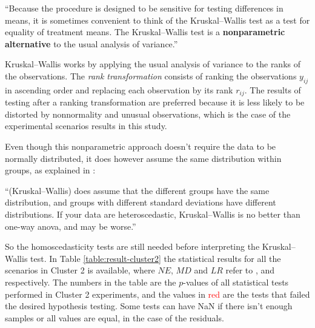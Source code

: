 \begin{displayquote}

``Because the procedure is designed to be sensitive for testing differences in means, it is sometimes convenient to think of the Kruskal–Wallis test as a test for equality of treatment means. The Kruskal–Wallis test is a \textbf{nonparametric alternative} to the usual analysis of variance.''

\end{displayquote}

Kruskal–Wallis works by applying the usual analysis of variance to the ranks of the observations. The \textit{rank transformation} consists of ranking the observations $y_{ij}$ in ascending order and replacing each observation by its rank $r_{ij}$. The results of testing after a ranking transformation are preferred because it is less likely to be distorted by nonnormality and unusual observations, which is the case of the experimental scenarios results in this study.

Even though this nonparametric approach doesn't require the data to be normally distributed, it does however assume the same distribution within groups, as explained in \cite{mcdonald2009handbook}:

\begin{displayquote}
    ``(Kruskal–Wallis) does assume that the different groups have the same distribution, and groups with different standard deviations have different distributions. If your data are heteroscedastic, Kruskal–Wallis is no better than one-way anova, and may be worse.''
\end{displayquote}

So the homoscedasticity tests are still needed before interpreting the Kruskal–Wallis test. In Table \ref{table:result-cluster2} the statistical results for all the scenarios in Cluster 2 is available, where $NE$, $MD$ and $LR$ refer to ,  and  respectively. The numbers in the table are the $p$-values of all statistical tests performed in Cluster 2 experiments, and the values in \textcolor{red}{red} are the tests that failed the desired hypothesis testing. Some tests can have NaN if there isn't enough samples or all values are equal, in the case of the residuals.

